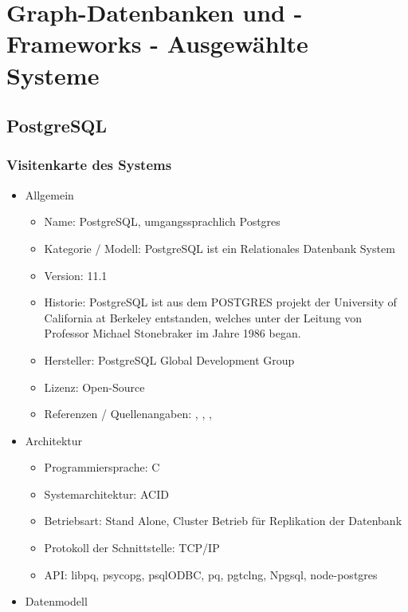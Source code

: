 \chapter{Graph-Datenbanken und -Frameworks - Ausgewählte Systeme }
\section{PostgreSQL}
\subsection{Visitenkarte des Systems}
    \begin{itemize}
        \item Allgemein
        \begin{itemize}
            \item Name: PostgreSQL, umgangssprachlich Postgres
            \item Kategorie / Modell: PostgreSQL ist ein Relationales Datenbank System
            \item Version: 11.1
            \item Historie: PostgreSQL ist aus dem POSTGRES projekt der University of California at Berkeley entstanden, welches unter der Leitung von  Professor Michael Stonebraker im Jahre 1986 began.
            \item Hersteller: PostgreSQL Global Development Group
            \item Lizenz: Open-Source
            \item Referenzen / Quellenangaben: \cite{froehlich01}, \cite{postgres2018}, \cite{postgresqldoc}, \cite{eisentraut01}
        \end{itemize}
        \item Architektur
        \begin{itemize}
            \item Programmiersprache: C
            \item Systemarchitektur: ACID
            \item Betriebsart: Stand Alone, Cluster Betrieb für Replikation der Datenbank
            \item Protokoll der Schnittstelle: TCP/IP %
            \item API: libpq, psycopg, psqlODBC, pq, pgtclng, Npgsql, node-postgres
        \end{itemize}
        \item Datenmodell

\end{itemize}
